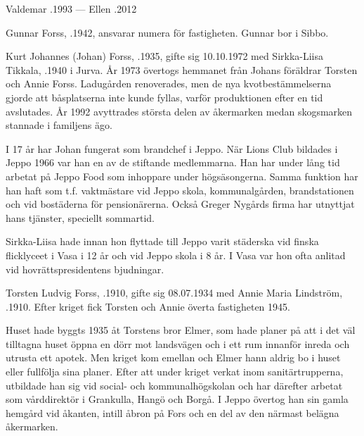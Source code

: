 Valdemar .1993  ---  Ellen .2012





Gunnar Forss, .1942, ansvarar numera för fastigheten. Gunnar bor i Sibbo.\jhvspace{}



Kurt Johannes (Johan) Forss, .1935, gifte sig 10.10.1972 med Sirkka-Liisa Tikkala, .1940 i Jurva. År 1973 övertogs hemmanet från Johans föräldrar Torsten och Annie Forss. Ladugården renoverades, men de nya kvotbestämmelserna gjorde att båsplatserna inte kunde fyllas, varför produktionen efter en tid avslutades. År 1992 avyttrades största delen av åkermarken medan skogsmarken stannade i familjens ägo.

I 17 år har Johan fungerat som brandchef i Jeppo. När Lions Club bildades i Jeppo 1966 var han en av de stiftande medlemmarna. Han har under lång tid arbetat på Jeppo Food som inhoppare under högsäsongerna. Samma funktion har han haft som t.f. vaktmästare vid Jeppo skola, kommunalgården, brandstationen och vid bostäderna för pensionärerna. Också Greger Nygårds firma har utnyttjat hans tjänster, speciellt sommartid.

Sirkka-Liisa hade innan hon flyttade till Jeppo varit städerska vid finska flicklyceet i Vasa i 12 år och vid Jeppo skola i 8 år. I Vasa var hon ofta anlitad vid hovrättspresidentens bjudningar.
\begin{jhchildren}
  \item {}
  \item {}
\end{jhchildren}


Torsten Ludvig Forss, .1910, gifte sig 08.07.1934 med Annie Maria Lindström, .1910. Efter kriget fick Torsten och Annie överta fastigheten 1945.

Huset hade byggts 1935 åt Torstens bror Elmer, som hade planer på att i det väl tilltagna huset öppna en dörr mot landsvägen och i ett rum innanför inreda och utrusta ett apotek. Men kriget kom emellan och Elmer hann aldrig bo i huset eller fullfölja sina planer. Efter att under kriget verkat inom sanitärtrupperna, utbildade han sig vid social- och kommunalhögskolan och har därefter arbetat som vårddirektör i Grankulla, Hangö och Borgå. I Jeppo övertog han sin gamla hemgård vid åkanten, intill åbron på Fors och en del av den närmast belägna åkermarken.

